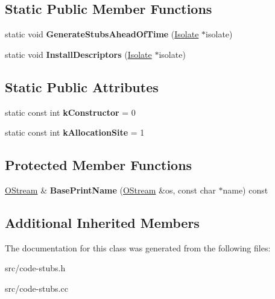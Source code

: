 \subsection*{Static Public Member Functions}
\begin{DoxyCompactItemize}
\item 
\hypertarget{classv8_1_1internal_1_1_array_constructor_stub_base_a2a1630e7b51bd5b96b1b742cd57f0225}{}static void {\bfseries Generate\+Stubs\+Ahead\+Of\+Time} (\hyperlink{classv8_1_1internal_1_1_isolate}{Isolate} $\ast$isolate)\label{classv8_1_1internal_1_1_array_constructor_stub_base_a2a1630e7b51bd5b96b1b742cd57f0225}

\item 
\hypertarget{classv8_1_1internal_1_1_array_constructor_stub_base_a317016e4c8c76f21711e8ca541109dc6}{}static void {\bfseries Install\+Descriptors} (\hyperlink{classv8_1_1internal_1_1_isolate}{Isolate} $\ast$isolate)\label{classv8_1_1internal_1_1_array_constructor_stub_base_a317016e4c8c76f21711e8ca541109dc6}

\end{DoxyCompactItemize}
\subsection*{Static Public Attributes}
\begin{DoxyCompactItemize}
\item 
\hypertarget{classv8_1_1internal_1_1_array_constructor_stub_base_a1f996ab3d2ddf2b485379945f126708d}{}static const int {\bfseries k\+Constructor} = 0\label{classv8_1_1internal_1_1_array_constructor_stub_base_a1f996ab3d2ddf2b485379945f126708d}

\item 
\hypertarget{classv8_1_1internal_1_1_array_constructor_stub_base_a95c8024ef3984c0a3862451761ea4226}{}static const int {\bfseries k\+Allocation\+Site} = 1\label{classv8_1_1internal_1_1_array_constructor_stub_base_a95c8024ef3984c0a3862451761ea4226}

\end{DoxyCompactItemize}
\subsection*{Protected Member Functions}
\begin{DoxyCompactItemize}
\item 
\hypertarget{classv8_1_1internal_1_1_array_constructor_stub_base_a2a491cf0c6beb60a323fc0d2ea03c035}{}\hyperlink{classv8_1_1internal_1_1_o_stream}{O\+Stream} \& {\bfseries Base\+Print\+Name} (\hyperlink{classv8_1_1internal_1_1_o_stream}{O\+Stream} \&os, const char $\ast$name) const \label{classv8_1_1internal_1_1_array_constructor_stub_base_a2a491cf0c6beb60a323fc0d2ea03c035}

\end{DoxyCompactItemize}
\subsection*{Additional Inherited Members}


The documentation for this class was generated from the following files\+:\begin{DoxyCompactItemize}
\item 
src/code-\/stubs.\+h\item 
src/code-\/stubs.\+cc\end{DoxyCompactItemize}
